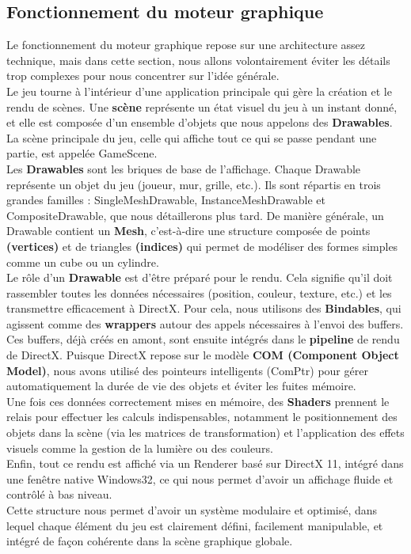 \subsection{Fonctionnement du moteur graphique}
Le fonctionnement du moteur graphique repose sur une architecture assez technique, mais dans cette section, nous allons volontairement éviter les détails trop complexes pour nous concentrer sur l’idée générale. \\
Le jeu tourne à l’intérieur d’une application principale qui gère la création et le rendu de scènes. Une \textbf{scène} représente un état visuel du jeu à un instant donné, et elle est composée d’un ensemble d’objets que nous appelons des \textbf{Drawables}. La scène principale du jeu, celle qui affiche tout ce qui se passe pendant une partie, est appelée GameScene. \\
Les \textbf{Drawables} sont les briques de base de l’affichage. Chaque Drawable représente un objet du jeu (joueur, mur, grille, etc.). Ils sont répartis en trois grandes familles : SingleMeshDrawable, InstanceMeshDrawable et CompositeDrawable, que nous détaillerons plus tard. De manière générale, un Drawable contient un \textbf{Mesh}, c’est-à-dire une structure composée de points \textbf{(vertices)} et de triangles \textbf{(indices)} qui permet de modéliser des formes simples comme un cube ou un cylindre. \\
Le rôle d’un \textbf{Drawable} est d’être préparé pour le rendu. Cela signifie qu’il doit rassembler toutes les données nécessaires (position, couleur, texture, etc.) et les transmettre efficacement à DirectX. Pour cela, nous utilisons des \textbf{Bindables}, qui agissent comme des \textbf{wrappers} autour des appels nécessaires à l’envoi des buffers. Ces buffers, déjà créés en amont, sont ensuite intégrés dans le \textbf{pipeline} de rendu de DirectX. Puisque DirectX repose sur le modèle \textbf{COM (Component Object Model)}, nous avons utilisé des pointeurs intelligents (ComPtr) pour gérer automatiquement la durée de vie des objets et éviter les fuites mémoire. \\
Une fois ces données correctement mises en mémoire, des \textbf{Shaders} prennent le relais pour effectuer les calculs indispensables, notamment le positionnement des objets dans la scène (via les matrices de transformation) et l’application des effets visuels comme la gestion de la lumière ou des couleurs. \\
Enfin, tout ce rendu est affiché via un Renderer basé sur DirectX 11, intégré dans une fenêtre native Windows32, ce qui nous permet d’avoir un affichage fluide et contrôlé à bas niveau. \\
Cette structure nous permet d’avoir un système modulaire et optimisé, dans lequel chaque élément du jeu est clairement défini, facilement manipulable, et intégré de façon cohérente dans la scène graphique globale. \\

